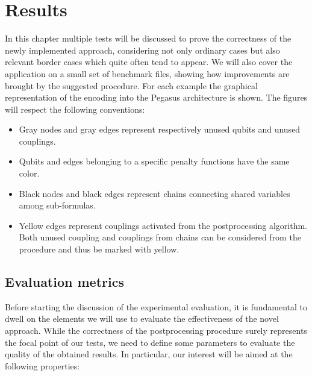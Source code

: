 \chapter{Results}
\label{cha:results}

In this chapter multiple tests will be discussed to prove the correctness of the newly implemented approach, considering not only ordinary cases but also relevant border cases which quite often tend to appear. We will also cover the application on a small set of benchmark files, showing how improvements are brought by the suggested procedure. For each example the graphical representation of the encoding into the Pegasus architecture is shown. The figures will respect the following conventions:

\begin{itemize}
    \item Gray nodes and gray edges represent respectively unused qubits and unused couplings.
    \item Qubits and edges belonging to a specific penalty functions have the same color.
    \item Black nodes and black edges represent chains connecting shared variables among sub-formulas.
    \item Yellow edges represent couplings activated from the postprocessing algorithm. Both unused coupling and couplings from chains can be considered from the procedure and thus be marked with yellow.
\end{itemize}

\section{Evaluation metrics}

Before starting the discussion of the experimental evaluation, it is fundamental to dwell on the elements we will use to evaluate the effectiveness of the novel approach. While the correctness of the postprocessing procedure surely represents the focal point of our tests, we need to define some parameters to evaluate the quality of the obtained results. In particular, our interest will be aimed at the following properties:

